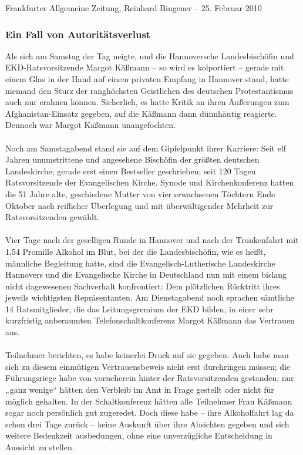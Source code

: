 \documentclass[a4paper,12pt,oneside]{scrbook}
\begin{document}
\newpage
Frankfurter Allgemeine Zeitung, Reinhard Bingener \hfill -- \hfill 25. Februar 2010
\subsubsection{Ein Fall von Autoritätsverlust}
Als sich am Samstag der Tag neigte, und die Hannoversche Landesbischöfin und EKD-Ratsvorsitzende Margot Käßmann – so wird es kolportiert – gerade mit einem Glas in der Hand auf einem privaten Empfang in Hannover stand, hatte niemand den Sturz der ranghöchsten Geistlichen des deutschen Protestantismus auch nur erahnen können. Sicherlich, es hatte Kritik an ihren Äußerungen zum Afghanistan-Einsatz gegeben, auf die Käßmann dann dünnhäutig reagierte. Dennoch war Margot Käßmann unangefochten.
\\\\
Noch am Samstagabend stand sie auf dem Gipfelpunkt ihrer Karriere: Seit elf Jahren unumstrittene und angesehene Bischöfin der größten deutschen Landeskirche; gerade erst einen Bestseller geschrieben; seit 120 Tagen Ratsvorsitzende der Evangelischen Kirche. Synode und Kirchenkonferenz hatten die 51 Jahre alte, geschiedene Mutter von vier erwachsenen Töchtern Ende Oktober nach reiflicher Überlegung und mit überwältigender Mehrheit zur Ratsvorsitzenden gewählt.
\\\\
Vier Tage nach der geselligen Runde in Hannover und nach der Trunkenfahrt mit 1,54 Promille Alkohol im Blut, bei der die Landesbischöfin, wie es heißt, männliche Begleitung hatte, sind die Evangelisch-Lutherische Landeskirche Hannovers und die Evangelische Kirche in Deutschland nun mit einem bislang nicht dagewesenen Sachverhalt konfrontiert: Dem plötzlichen Rücktritt ihres jeweils wichtigsten Repräsentanten. Am Dienstagabend noch sprachen sämtliche 14 Ratsmitglieder, die das Leitungsgremium der EKD bilden, in einer sehr kurzfristig anberaumten Telefonschaltkonferenz Margot Käßmann das Vertrauen aus.\\\\
Teilnehmer berichten, es habe keinerlei Druck auf sie gegeben. Auch habe man sich zu diesem einmütigen Vertrauensbeweis nicht erst durchringen müssen; die Führungsriege habe von vorneherein hinter der Ratsvorsitzenden gestanden; nur „ganz wenige“ hätten den Verbleib im Amt in Frage gestellt oder nicht für möglich gehalten. In der Schaltkonferenz hätten alle Teilnehmer Frau Käßmann sogar noch persönlich gut zugeredet. Doch diese habe – ihre Alkoholfahrt lag da schon drei Tage zurück – keine Auskunft über ihre Absichten gegeben und sich weitere Bedenkzeit ausbedungen, ohne eine unverzügliche Entscheidung in Aussicht zu stellen.
\end{document}
